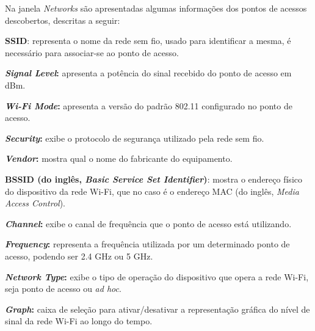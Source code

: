 \begin{figure}[H]
	\centering
\end{figure}

Na janela \textit{Networks} são apresentadas algumas informações dos pontos de acessos descobertos, descritas a seguir:

\begin{compactitem}
	\item \textbf{SSID}: representa o nome da rede sem fio, usado para identificar a mesma, é necessário para associar-se ao ponto de acesso.
	\item \textbf{\textit{Signal Level}:} apresenta a potência do sinal recebido do ponto de acesso em dBm.
	\item \textbf{\textit{Wi-Fi Mode}:} apresenta a versão do padrão 802.11 configurado no ponto de acesso.
	\item \textbf{\textit{Security}:} exibe o protocolo de segurança utilizado pela rede sem fio.
	\item \textbf{\textit{Vendor}:} mostra qual o nome do fabricante do equipamento.
	\item \textbf{BSSID (do inglês, \textit{Basic Service Set Identifier})}: mostra o endereço físico do dispositivo da rede Wi-Fi, que no caso é o endereço MAC (do inglês, \textit{Media Access Control}).
	\item \textbf{\textit{Channel}:} exibe o canal de frequência que o ponto de acesso está utilizando.
	\item \textbf{\textit{Frequency}:} representa a frequência utilizada por um determinado ponto de acesso, podendo ser 2.4 GHz ou 5 GHz.
	\item \textbf{\textit{Network Type}:} exibe o tipo de operação do dispositivo que opera a rede Wi-Fi, seja ponto de acesso ou \textit{ad hoc}.
	\item \textbf{\textit{Graph}:} caixa de seleção para ativar/desativar a representação gráfica do nível de sinal da rede Wi-Fi ao longo do tempo.
\end{compactitem}
	
